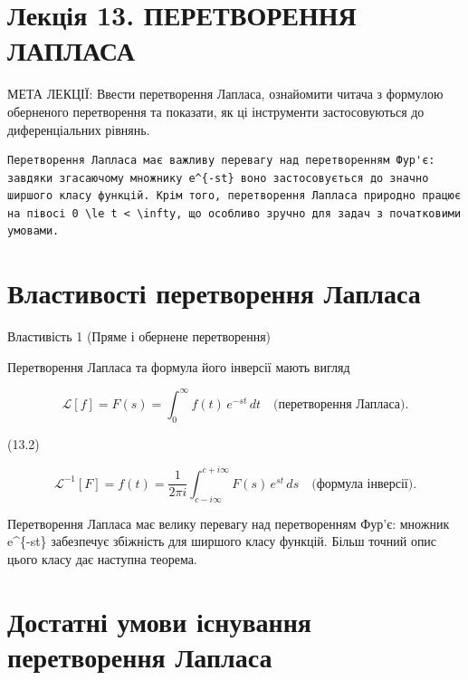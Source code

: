 \documentclass[
  ukrainian,
]{article}
\begin{document}
\section{Лекція 13. ПЕРЕТВОРЕННЯ
ЛАПЛАСА}\label{ux43bux435ux43aux446ux456ux44f-13.-ux43fux435ux440ux435ux442ux432ux43eux440ux435ux43dux43dux44f-ux43bux430ux43fux43bux430ux441ux430}

МЕТА ЛЕКЦІЇ: Ввести перетворення Лапласа, ознайомити читача з формулою
оберненого перетворення та показати, як ці інструменти застосовуються до
диференціальних рівнянь.

\begin{verbatim}
Перетворення Лапласа має важливу перевагу над перетворенням Фур'є: завдяки згасаючому множнику e^{-st} воно застосовується до значно ширшого класу функцій. Крім того, перетворення Лапласа природно працює на півосі 0 \le t < \infty, що особливо зручно для задач з початковими умовами.
\end{verbatim}

\section{Властивості перетворення
Лапласа}\label{ux432ux43bux430ux441ux442ux438ux432ux43eux441ux442ux456-ux43fux435ux440ux435ux442ux432ux43eux440ux435ux43dux43dux44f-ux43bux430ux43fux43bux430ux441ux430}

Властивість 1 (Пряме і обернене перетворення)

Перетворення Лапласа та формула його інверсії мають вигляд

\[
\mathscr{L}[f] = F(s) = \int_{0}^{\infty} f(t) \, e^{-st} \, dt
\quad \text{(перетворення Лапласа).}
\]

(13.2)

\[
\mathscr{L}^{-1}[F] = f(t) = \frac{1}{2\pi i} \int_{c-i\infty}^{c+i\infty} F(s) \, e^{st} \, ds
\quad \text{(формула інверсії).}
\]

Перетворення Лапласа має велику перевагу над перетворенням Фур'є:
множник e\^{}\{-st\} забезпечує збіжність для ширшого класу функцій.
Більш точний опис цього класу дає наступна теорема.

\section{Достатні умови існування перетворення
Лапласа}\label{ux434ux43eux441ux442ux430ux442ux43dux456-ux443ux43cux43eux432ux438-ux456ux441ux43dux443ux432ux430ux43dux43dux44f-ux43fux435ux440ux435ux442ux432ux43eux440ux435ux43dux43dux44f-ux43bux430ux43fux43bux430ux441ux430}
\end{document}
